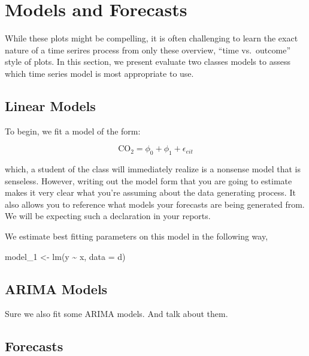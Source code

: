 \documentclass[AER]{AEA}
\newenvironment{Shaded}{\begin{snugshade}}{\end{snugshade}}
\newcommand{\AttributeTok}[1]{\textcolor[rgb]{0.77,0.63,0.00}{#1}}
\newcommand{\FunctionTok}[1]{\textcolor[rgb]{0.00,0.00,0.00}{#1}}
\newcommand{\NormalTok}[1]{#1}
\newcommand{\OtherTok}[1]{\textcolor[rgb]{0.56,0.35,0.01}{#1}}
\newcommand{\SpecialCharTok}[1]{\textcolor[rgb]{0.00,0.00,0.00}{#1}}
\begin{document}
\hypertarget{models-and-forecasts}{%
\section{Models and Forecasts}\label{models-and-forecasts}}

While these plots might be compelling, it is often challenging to learn
the exact nature of a time serires process from only these overview,
``time vs.~outcome'' style of plots. In this section, we present
evaluate two classes models to assess which time series model is most
appropriate to use.

\hypertarget{linear-models}{%
\subsection{Linear Models}\label{linear-models}}

To begin, we fit a model of the form:

\begin{equation}
\label{eq:one}
\text{CO}_{2} = \phi_{0} + \phi_{1} + \epsilon_{eit}
\end{equation}

which, a student of the class will immediately realize is a nonsense
model that is senseless. However, writing out the model form that you
are going to estimate makes it very clear what you're assuming about the
data generating process. It also allows you to reference what models
your forecasts are being generated from. We will be expecting such a
declaration in your reports.

We estimate best fitting parameters on this model in the following way,

\begin{Shaded}
\begin{Highlighting}[]
\NormalTok{model\_1 }\OtherTok{\textless{}{-}} \FunctionTok{lm}\NormalTok{(y }\SpecialCharTok{\textasciitilde{}}\NormalTok{ x, }\AttributeTok{data =}\NormalTok{ d)}
\end{Highlighting}
\end{Shaded}

\hypertarget{arima-models}{%
\subsection{ARIMA Models}\label{arima-models}}

Sure we also fit some ARIMA models. And talk about them.

\hypertarget{forecasts}{%
\subsection{Forecasts}\label{forecasts}}
\end{document}
